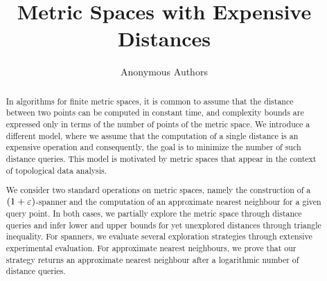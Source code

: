 \documentclass[a4paper,UKenglish,cleveref, autoref]{lipics-v2019}
\title{Metric Spaces with Expensive Distances}
\author{Anonymous Authors}{Anonymous}{}{}{}
\begin{document}
\maketitle

\begin{abstract}
In algorithms for finite metric spaces, it is common
to assume that the distance between two points
can be computed in constant time, and complexity
bounds are expressed only in terms of the number
of points of the metric space.
We introduce a different model, where we assume
that the computation of a single distance is
an expensive operation and consequently, the goal is
to minimize the number of such distance queries.
This model is motivated by metric spaces
that appear in the context of topological data analysis.

We consider two standard operations on metric spaces,
namely the construction of a $(1+\varepsilon)$-spanner
and the computation of an approximate nearest
neighbour for a given query point.
In both cases, we partially explore the metric space
through distance queries and infer lower and upper bounds
for yet unexplored distances through triangle inequality.
For spanners, we evaluate several exploration strategies
through extensive experimental evaluation.
For approximate nearest neighbours, we prove that our
strategy returns an approximate nearest neighbour
after a logarithmic number of distance queries.
\end{abstract}

\newpage




\end{document}
